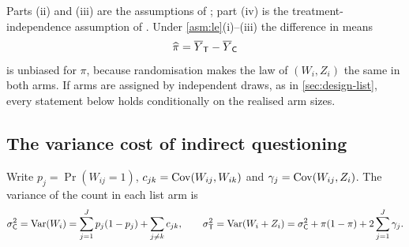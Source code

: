 Parts (ii) and (iii) are the assumptions of \citet{blair2012}; part (iv) is the treatment-independence assumption of \citet{aronow2015}. Under \cref{asm:le}(i)--(iii) the difference in means
\begin{equation}\label{eq:le-dim}
  \widehat\pi=\overline Y_{\mathsf{T}}-\overline Y_{\mathsf{C}}
\end{equation}
is unbiased for $\pi$, because randomisation makes the law of $(W_i,Z_i)$ the same in both arms. If arms are assigned by independent draws, as in \cref{sec:design-list}, every statement below holds conditionally on the realised arm sizes.

\subsection{The variance cost of indirect questioning}\label{sec:sens-var}

Write $p_j=\Pr(W_{ij}=1)$, $c_{jk}=\operatorname{Cov}(W_{ij},W_{ik})$ and $\gamma_j=\operatorname{Cov}(W_{ij},Z_i)$. The variance of the count in each list arm is
\begin{equation}\label{eq:le-sig}
  \sigma_{\mathsf{C}}^2=\operatorname{Var}(W_i)=\sum_{j=1}^Jp_j(1-p_j)+\sum_{j\neq k}c_{jk},\qquad
  \sigma_{\mathsf{T}}^2=\operatorname{Var}(W_i+Z_i)=\sigma_{\mathsf{C}}^2+\pi(1-\pi)+2\sum_{j=1}^J\gamma_j.
\end{equation}

